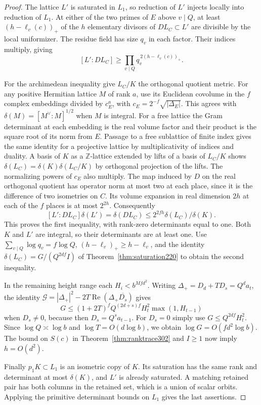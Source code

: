 \documentclass[a4paper,11pt]{article}
\theoremstyle{definition}
\theoremstyle{remark}
\newcommand{\ZZ}{\mathbb Z}\newcommand{\ord}{\operatorname{ord}}
\numberwithin{equation}{section}
\begin{document}
\begin{proof}
The lattice \(L'\) is saturated in \(L_1\), so reduction of
\(L'\) injects locally into reduction of \(L_1\). At either
of the two primes of \(E\) above \(v\mid Q\), at least
\((h-\ell_v(c))_+\) of the \(h\) elementary divisors of
\(D L_C\subset L'\) are divisible by the local uniformizer.
The residue field has size \(q_v\) in each factor. Their
indices multiply, giving
\[
                [L':D L_C]\ge
                     \prod_{v\mid Q} q_v^{\,2(h-\ell_v(c))_+}.
\]

For the archimedean inequality give \(L_C/K\) the orthogonal
quotient metric. For any positive Hermitian lattice \(M\)
of rank \(a\), use its Euclidean covolume in the \(f\) complex
embeddings divided by \(c_E^a\), with
\(c_E=2^{-f}\sqrt{|\Delta_E|}\).
This agrees with \(\delta(M)=[M^\vee:M]^{1/2}\) when \(M\)
is integral. For a free lattice the Gram determinant at each
embedding is the real volume factor and their product is
the square root of its norm from \(E\). Passage to a free
sublattice of finite index gives the same identity for a
projective lattice by multiplicativity of indices and duality.
A basis of \(K\) as a \(\ZZ\)-lattice extended by lifts of a
basis of \(L_C/K\) shows
\(\delta(L_C)=\delta(K)\delta(L_C/K)\) by orthogonal
projection of the lifts. The normalizing powers of \(c_E\)
also multiply. The map induced by \(D\) on the real
orthogonal quotient has operator norm at most two at each
place, since it is the difference of two isometries on \(C\).
Its volume expansion in real dimension \(2h\) at each of
the \(f\) places is at most \(2^{2h}\). Consequently
\[
 [L':D L_C]\delta(L')=\delta(DL_C)
       \le 2^{2fh}\delta(L_C)/\delta(K).
\]
This proves the first inequality, with rank-zero determinants
equal to one. Both \(K\) and \(L'\) are integral, so their
determinants are at least one. Use
\(\sum_{v\mid Q}\log q_v=f\log Q\),
\((h-\ell_v)_+\ge h-\ell_v\), and the identity
\(\delta(L_C)=G/(Q^{2df}I)\) of Theorem~\ref{thm:saturation220}
to obtain the second inequality.

In the remaining height range each \(H_i<b^{Mfd^2}\).
Writing \(\Delta_+=D_d+TD_s=Q^d a_t\), the identity
\(\mathcal G=|\Delta_+|^2-2T\operatorname{Re}
(\Delta_+\overline{D_s})\) gives
\[
 G\le (1+2T)^f Q^{(2d+s)f} H_t^2
                 \max(1,H_{t-1})
\]
when \(D_s\ne0\), because then \(D_s=Q^s a_{t-1}\).
For \(D_s=0\) simply use \(G\le Q^{2df}H_t^2\).
Since \(\log Q\asymp\log b\) and \(\log T=O(d\log b)\),
we obtain \(\log G=O(fd^2\log b)\). The bound on \(S(c)\)
in Theorem~\ref{thm:ranktrace302} and \(I\ge1\) now imply
\(h=O(d^2)\).

Finally \(p_1K\subset L_1\) is an isometric copy of \(K\).
Its saturation has the same rank and determinant at most
\(\delta(K)\), and \(L'\) is already saturated. A matching
retained pair has both columns in the retained set, which
is a union of scalar orbits. Applying the primitive
determinant bounds on \(L_1\) gives the last assertions.
\end{proof}
\end{document}
